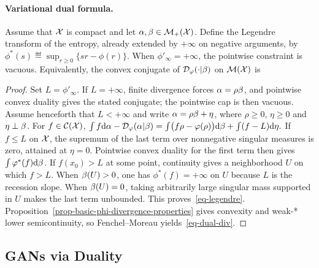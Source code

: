 \paragraph{Variational dual formula.}
\begin{proposition}\label{prop-phi-div-dual}
Assume that $\mathcal{X}$ is compact and let $\alpha,\beta\in\mathcal{M}_+(\mathcal{X})$. Define the Legendre transform of the entropy, already extended by $+\infty$ on negative arguments, by \(\phi^*(s) \eqdef \sup_{r\geq0}\{sr-\phi(r)\}.\)
When $\phi'_\infty=+\infty$, the pointwise constraint is vacuous.
Equivalently, the convex conjugate of $\mathcal{D}_\varphi(\cdot|\beta)$ on $\mathcal{M}(\mathcal{X})$ is
\end{proposition}
\begin{proof}
Set $L=\phi'_\infty$. If $L=+\infty$, finite divergence forces $\alpha=\rho\beta$, and pointwise convex duality gives the stated conjugate; the pointwise cap is then vacuous. Assume henceforth that $L<+\infty$ and write $\alpha=\rho\beta+\eta$, where $\rho\geq0$, $\eta\geq0$ and $\eta\perp\beta$. For $f\in\mathcal{C}(\mathcal{X})$,
\(\int f\mathrm{d}\alpha-\mathcal{D}_\varphi(\alpha|\beta) = \int\bigl(f\rho-\varphi(\rho)\bigr)\mathrm{d}\beta + \int(f-L)\mathrm{d}\eta.\)
If $f\leq L$ on $\mathcal{X}$, the supremum of the last term over nonnegative singular measures is zero, attained at $\eta=0$. Pointwise convex duality for the first term then gives $\int\varphi^*(f)\mathrm{d}\beta$. If $f(x_0)>L$ at some point, continuity gives a neighborhood $U$ on which $f>L$. When $\beta(U)>0$, one has $\phi^*(f)=+\infty$ on $U$ because $L$ is the recession slope. When $\beta(U)=0$, taking arbitrarily large singular mass supported in $U$ makes the last term unbounded. This proves~\eqref{eq-legendre}. Proposition~\ref{prop-basic-phi-divergence-properties} gives convexity and weak-* lower semicontinuity, so Fenchel--Moreau yields~\eqref{eq-dual-div}.
\end{proof}
\subsection{GANs via Duality}
\label{sec-gan-duality}

